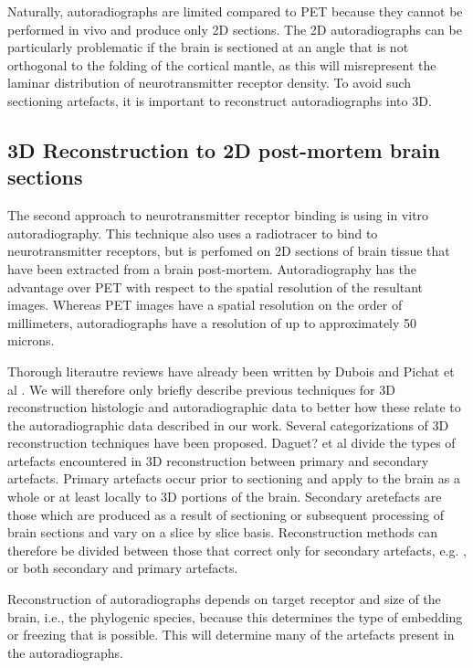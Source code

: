 \documentclass[12pt]{article}
\begin{document}
Naturally, autoradiographs are limited compared to PET because they cannot be performed in vivo and produce only 2D sections. The 2D autoradiographs can be particularly problematic if the brain is sectioned at an angle that is not orthogonal to the folding of the cortical mantle, as this will misrepresent the laminar distribution of neurotransmitter receptor density. To avoid such sectioning artefacts, it is important to reconstruct autoradiographs into 3D. 

\subsection{3D Reconstruction to 2D post-mortem brain sections}
The second approach to neurotransmitter receptor binding is using in vitro autoradiography. This technique also uses a radiotracer to bind to neurotransmitter receptors, but is perfomed on 2D sections of brain tissue that have been extracted from a brain post-mortem. Autoradiography has the advantage over PET with respect to the spatial resolution of the resultant images. Whereas PET images have a spatial resolution on the order of millimeters, autoradiographs have a resolution of up to approximately 50 microns. 

Thorough literautre reviews have already been written by Dubois \cite{Dubois2007} and Pichat et al \cite{Pichat2018}. We will therefore only briefly describe previous techniques for 3D reconstruction histologic and autoradiographic data to better how these relate to the autoradiographic data described in our work. Several categorizations of 3D reconstruction techniques have been proposed. Daguet? et al \cite{CITATION} divide the types of artefacts encountered in 3D reconstruction between primary and secondary artefacts. Primary artefacts occur prior to sectioning and apply to the brain as a whole or at least locally to 3D portions of the brain. Secondary aretefacts are those which are produced as a result of sectioning or subsequent processing of brain sections and vary on a slice by slice basis. Reconstruction methods can therefore be divided between those that correct only for secondary artefacts, e.g. \cite{Chakravarty2006}, or both secondary and primary artefacts.

Reconstruction of autoradiographs depends on target receptor and size of the brain, i.e., the phylogenic species, because this determines the type of embedding or freezing that is possible. This will determine many of the artefacts present in the autoradiographs.
\end{document}
